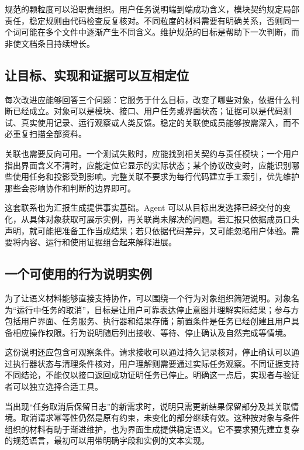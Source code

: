 规范的颗粒度可以沿职责组织。用户任务说明端到端成功含义，模块契约规定局部责任，稳定规则由代码检查反复核对。不同粒度的材料需要有明确关系，否则同一个词可能在多个文件中逐渐产生不同含义。维护规范的目标是帮助下一次判断，而非使文档条目持续增长。

\subsection{让目标、实现和证据可以互相定位}
每次改进应能够回答三个问题：它服务于什么目标，改变了哪些对象，依据什么判断已经成立。对象可以是模块、接口、用户任务或界面状态；证据可以是代码测试、真实使用记录、运行观察或人类反馈。稳定的关联使成员能够按需深入，而不必重复扫描全部资料。

关联也需要反向可用。一个测试失败时，应能找到相关契约与责任模块；一个用户指出界面含义不清时，应能定位它显示的实际状态；某个协议改变时，应能识别哪些使用任务和投影受到影响。完整关联不要求为每行代码建立手工索引，优先维护那些会影响协作和判断的边界即可。


这套联系也为汇报生成提供事实基础。Agent 可以从目标出发选择已经交付的变化，从具体对象获取可展示实例，再关联尚未解决的问题。若汇报只依据成员口头声明，就可能把准备工作当成结果；若只依据代码差异，又可能忽略用户体验。需要将内容、运行和使用证据组合起来解释进展。

\subsection{一个可使用的行为说明实例}
为了让语义材料能够直接支持协作，可以围绕一个行为对象组织简短说明。对象名为“运行中任务的取消”，目标是让用户可靠表达停止意图并理解实际结果；参与方包括用户界面、任务服务、执行器和结果存储；前置条件是任务已经创建且用户具备相应操作权限。行为说明随后列出接收、等待、停止确认及自然完成等情境。

这份说明还应包含可观察条件。请求接收可以通过持久记录核对，停止确认可以通过执行器状态与清理条件核对，用户理解则需要通过实际任务观察。不同证据支持不同结论，不能仅以接口返回成功证明任务已停止。明确这一点后，实现者与验证者可以独立选择合适工具。

当出现“任务取消后保留日志”的新需求时，说明只需更新结果保留部分及其关联情境。取消请求幂等性仍然是原有约束，未变化的部分继续有效。这种按对象与条件组织的材料有助于渐进维护，也为界面生成提供稳定语义。它不要求预先建立复杂的规范语言，最初可以用带明确字段和实例的文本实现。

